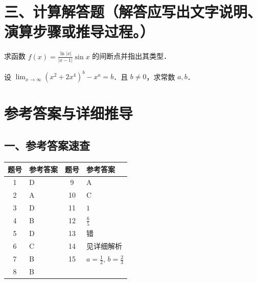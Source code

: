 \documentclass[
  a4paper,
  11pt,
  title in boldface,
  theorem in new line,
  remove problem qed
]{homework}
\begin{document}
\section*{三、计算解答题（解答应写出文字说明、演算步骤或推导过程。）}

\begin{problem}
  求函数 $f(x) = \frac{\ln|x|}{|x-1|} \sin x$ 的间断点并指出其类型．

  \vspace{3.5cm}
\end{problem}

\begin{problem}
  设 $\lim_{x \to \infty} (x^2+2x^4)^b - x^a = b$．且 $b \ne 0$，求常数 $a, b$．

  \vspace{3.5cm}
\end{problem}

\clearpage
\section*{参考答案与详细推导}

\subsection*{一、参考答案速查}

\begin{center}
\begin{tabular}{c p{5.5cm} c p{5.5cm}}
  \toprule
  \textbf{题号} & \textbf{参考答案} & \textbf{题号} & \textbf{参考答案} \\
  \midrule
  1 & D & 9 & A \\
  2 & A & 10 & C \\
  3 & D & 11 & $1$ \\
  4 & B & 12 & $\frac{6}{5}$ \\
  5 & D & 13 & 错 \\
  6 & C & 14 & 见详细解析 \\
  7 & B & 15 & $a = \frac{1}{2}$, $b = \frac{2}{3}$ \\
  8 & B &  &  \\
  \bottomrule
\end{tabular}
\end{center}
\end{document}
